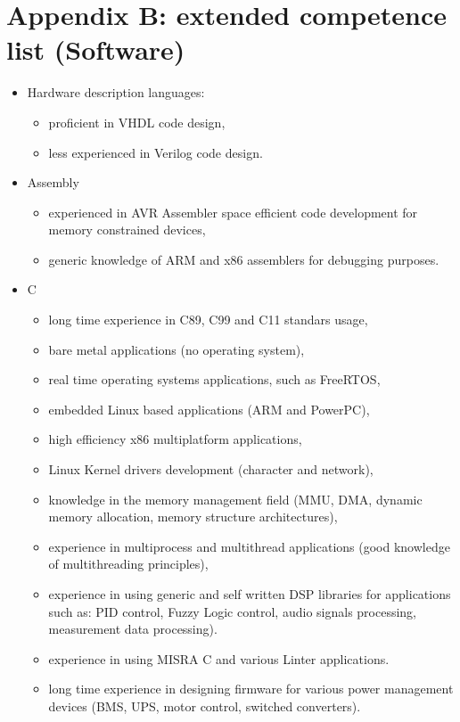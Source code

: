 \documentclass{tccv}
\begin{document}
\section{Appendix B: extended competence list (Software)}

\begin{itemize}
	\item Hardware description languages:
	\begin{itemize}
		\item proficient in VHDL code design,
		\item less experienced in Verilog code design. 
	\end{itemize}
	\item Assembly
		\begin{itemize}
			\item experienced in AVR Assembler space efficient code development for memory constrained devices,
			\item generic knowledge of ARM and x86 assemblers for debugging purposes.
		\end{itemize}
	\item C
		\begin{itemize}
			\item long time experience in C89, C99 and C11 standars usage,
			\item bare metal applications (no operating system),
			\item real time operating systems applications, such as FreeRTOS,
			\item embedded Linux based applications (ARM and PowerPC),
			\item high efficiency x86 multiplatform applications,
			\item Linux Kernel drivers development (character and network),
			\item knowledge in the memory management field (MMU, DMA, dynamic memory allocation, memory structure architectures),
			\item experience in multiprocess and multithread applications (good knowledge of multithreading principles),
			\item experience in using generic and self written DSP libraries for applications such as: PID control, Fuzzy Logic control, audio signals processing, measurement data processing).
			\item experience in using MISRA C and various Linter applications.
			\item long time experience in designing firmware for various power management devices (BMS, UPS, motor control, switched converters).

\end{itemize}
\end{itemize}
\end{document}
